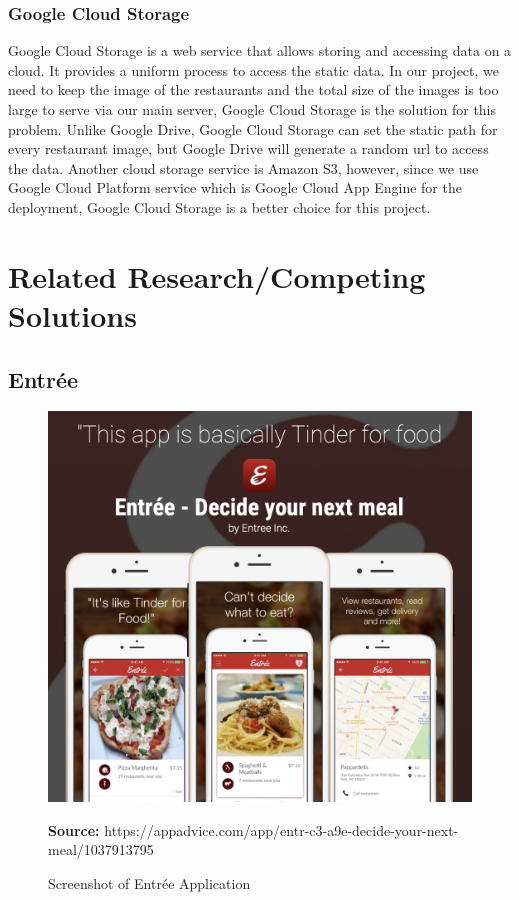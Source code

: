 \documentclass[12pt,oneside,openright,a4paper]{cpe-english-project}
\newcommand*{\captionsource}[2]{%
  \caption[{#1}]{#1}\vspace{-8pt}
  \textbf{Source:} #2}
\begin{document}
\subsubsection{Google Cloud Storage}

Google Cloud Storage is a web service that allows storing and accessing data on a cloud. It provides a uniform process to access the static data. In our project, we need to keep the image of the restaurants and the total size of the images is too large to serve via our main server, Google Cloud Storage is the solution for this problem. Unlike Google Drive, Google Cloud Storage can set the static path for every restaurant image, but Google Drive will generate a random url to access the data. Another cloud storage service is Amazon S3, however, since we use Google Cloud Platform service which is Google Cloud App Engine for the deployment, Google Cloud Storage is a better choice for this project.


\section{Related Research/Competing Solutions}

\subsection{Entrée}

\begin{figure}[H]\centering
\includegraphics[width=400pt]{./images/2eatsee.png}
\label{fig:2eatsee}
\captionsource{Screenshot of Entrée Application}{https://appadvice.com/app/entr-c3-a9e-decide-your-next-meal/1037913795}
\end{figure}\vspace{-24pt}
\vspace{1em}
\end{document}
